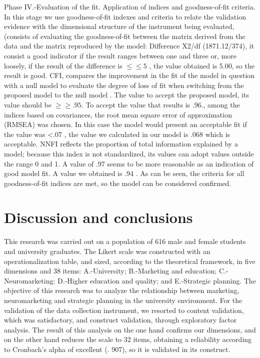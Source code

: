 \documentclass[english]{textolivre}
\begin{document}
Phase IV.-Evaluation of the fit. Application of indices and goodness-of-fit criteria. In this stage we use goodness-of-fit indexes and criteria to relate the validation evidence with the dimensional structure of the instrument being evaluated, (consists of evaluating the goodness-of-fit between the matrix derived from the data and the matrix reproduced by the model: Difference X2/df (1871.12/374), it consist a good indicator if the result ranges between one and three or, more loosely, if the result of the difference is $\leqslant≤5$ \cite{carmines_analyzing_1981,joreskog_general_1970}, the value obtained is 5.00, so the result is good. CFI, compares the improvement in the fit of the model in question with a null model to evaluate the degree of loss of fit when switching from the proposed model to the null model \cite{hu_cutoff_1999}. The value to accept the proposed model, its value should be $\geqslant≥.95.$ To accept the value that results is .96., among the indices based on covariances, the root mean square error of approximation (RMSEA) was chosen. In this case the model would present an acceptable fit if the value was <.07 \cite{steiger_understanding_2007}, the value we calculated in our model is .068 which is acceptable. NNFI reflects the proportion of total information explained by a model; because this index is not standardized, its values can adopt values outside the range 0 and 1. A value of .97 seems to be more reasonable as an indication of good model fit. A value we obtained is .94 \cite[p.~41]{schermelleh_._2003}. As can be seen, the criteria for all goodness-of-fit indices are met, so the model can be considered confirmed.

\section{Discussion and conclusions}

This research was carried out on a population of 616 male and female students and university graduates. The Likert scale was constructed with an operationalization table, and sized, according to the theoretical framework, in five dimensions and 38 items: A.-University; B.-Marketing and education; C.-Neuromarketing: D.-Higher education and quality; and E.-Strategic planning. The objective of this research was to analyze the relationship between marketing, neuromarketing and strategic planning in the university environment. For the validation of the data collection instrument, we resorted to content validation, which was satisfactory, and construct validation, through exploratory factor analysis. The result of this analysis on the one hand confirms our dimensions, and on the other hand reduces the scale to 32 items, obtaining a reliability according to Cronbach's alpha of excellent (. 907), so it is validated in its construct.
\end{document}
